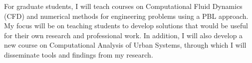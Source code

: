 \documentclass[12pt]{article}
\begin{document}
For graduate students, I will teach courses on Computational Fluid Dynamics (CFD) and numerical methods for engineering problems using a PBL approach. My focus will be on teaching students to develop solutions that would be useful for their own research and professional work. In addition, I will also develop a new course on Computational Analysis of Urban Systems, through which I will disseminate tools and findings from my research.

 

\end{document}
